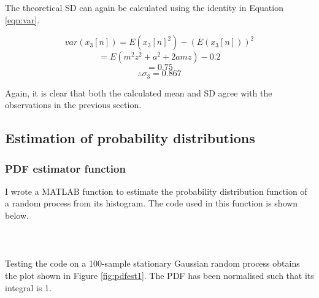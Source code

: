 \noindent
The theoretical SD can again be calculated using the identity in Equation \ref{eqn:var}.

\begin{center}
\begin{equation}
var(x_{3}[n])=E(x_{3}[n]^{2})-(E(x_{3}[n]))^{2}
\end{equation} \begin{equation}
=E(m^{2}z^{2}+a^{2}+2amz)-0.2
\end{equation} \begin{equation}
=0.75
\end{equation} \begin{equation}
\therefore \sigma_{3} = 0.867
\end{equation}
\end{center}
\noindent
Again, it is clear that both the calculated mean and SD agree with the observations in the previous section.

\subsection{Estimation of probability distributions}

\subsubsection{PDF estimator function}

I wrote a MATLAB function to estimate the probability distribution function of a random process from its histogram. The code used in this function is shown below.
\\\\
\\\\
Testing the code on a 100-sample stationary Gaussian random process obtains the plot shown in Figure \ref{fig:pdfest1}. The PDF has been normalised such that its integral is 1.

